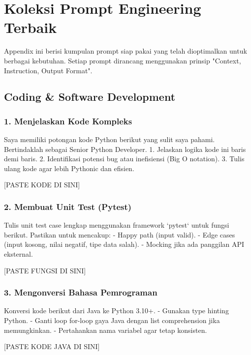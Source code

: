 \chapter{Koleksi Prompt Engineering Terbaik}
\label{chap:prompts}

Appendix ini berisi kumpulan prompt siap pakai yang telah dioptimalkan untuk berbagai kebutuhan. Setiap prompt dirancang menggunakan prinsip "Context, Instruction, Output Format".

\section{Coding \& Software Development}

\subsection{1. Menjelaskan Kode Kompleks}
\begin{promptbox}
Saya memiliki potongan kode Python berikut yang sulit saya pahami. Bertindaklah sebagai Senior Python Developer.
1. Jelaskan logika kode ini baris demi baris.
2. Identifikasi potensi bug atau inefisiensi (Big O notation).
3. Tulis ulang kode agar lebih Pythonic dan efisien.

[PASTE KODE DI SINI]
\end{promptbox}

\subsection{2. Membuat Unit Test (Pytest)}
\begin{promptbox}
Tulis unit test case lengkap menggunakan framework `pytest` untuk fungsi berikut. Pastikan untuk mencakup:
- Happy path (input valid).
- Edge cases (input kosong, nilai negatif, tipe data salah).
- Mocking jika ada panggilan API eksternal.

[PASTE FUNGSI DI SINI]
\end{promptbox}

\subsection{3. Mengonversi Bahasa Pemrograman}
\begin{promptbox}
Konversi kode berikut dari Java ke Python 3.10+.
- Gunakan type hinting Python.
- Ganti loop for-loop gaya Java dengan list comprehension jika memungkinkan.
- Pertahankan nama variabel agar tetap konsisten.

[PASTE KODE JAVA DI SINI]
\end{promptbox}

